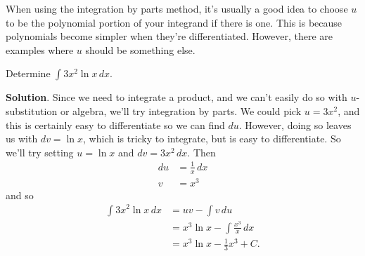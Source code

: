 \documentclass[10pt,]{book}
\theoremstyle{ptxplainnotitle}
\theoremstyle{ptxplaintitle}
\theoremstyle{ptxplainnotitle}
\theoremstyle{ptxplaintitle}
\theoremstyle{ptxplainnotitle}
\theoremstyle{ptxplaintitle}
\theoremstyle{ptxdefinitionnotitle}
\theoremstyle{ptxdefinitiontitle}
\theoremstyle{ptxdefinitionnotitle}
\theoremstyle{ptxdefinitiontitle}
\theoremstyle{ptxdefinitionnotitle}
\theoremstyle{ptxdefinitiontitle}
\theoremstyle{ptxdefinitionnotitle}
\theoremstyle{ptxdefinitiontitle}
\theoremstyle{ptxdefinitionnotitle}
\theoremstyle{ptxdefinitiontitle}
\numberwithin{equation}{section}
\begin{document}
\hypertarget{p-505}{}%
When using the integration by parts method, it's usually a good idea to choose \(u\) to be the polynomial portion of your integrand if there is one. This is because polynomials become simpler when they're differentiated. However, there are examples where \(u\) should be something else.%
\begin{example}\label{example-integrals-involving-the-natural-logarithm}
\hypertarget{p-506}{}%
Determine \(\int 3x^{2}\ln x\,dx\).%
\par\smallskip%
\noindent\textbf{Solution}.\hypertarget{solution-111}{}\quad%
\hypertarget{p-507}{}%
Since we need to integrate a product, and we can't easily do so with \(u\)-substitution or algebra, we'll try integration by parts. We could pick \(u = 3x^{2}\), and this is certainly easy to differentiate so we can find \(du\). However, doing so leaves us with \(dv = \ln x\), which is tricky to integrate, but is easy to differentiate. So we'll try setting \(u = \ln x\) and \(dv = 3x^{2}\,dx\). Then%
%
\begin{align*}
du & = \frac{1}{x}\,dx \\
v & = x^{3} 
\end{align*}
\hypertarget{p-508}{}%
and so%
%
\begin{align*}
\int 3x^{2}\ln x\,dx & = uv - \int v\,du \\
& = x^{3}\ln x - \int \frac{x^{3}}{x}\,dx \\
& = x^{3}\ln x - \frac{1}{3}x^{3} + C. 
\end{align*}
\end{example}
\end{document}
